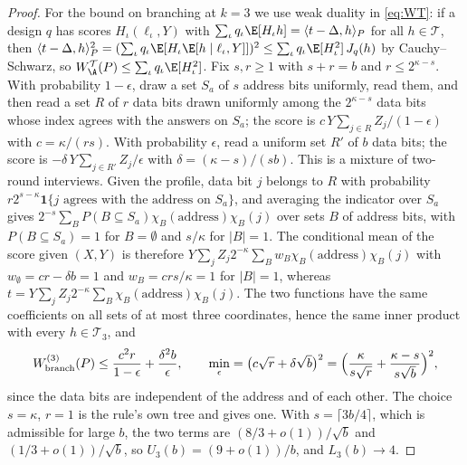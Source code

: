 \begin{proof}
For the bound on branching at $k=3$ we use weak duality in \eqref{eq:WT}: if
a design $q$ has scores $H_\iota(\ell_\iota,Y)$ with
$\sum_\iota q_\iota\E[H_\iota h]=\langle t-\Delta,h\rangle_P$ for all
$h\in\mathcal T$, then
$\langle t-\Delta,h\rangle_P^2=(\sum_\iota q_\iota\E[H_\iota\E[h\mid\ell_\iota,Y]])^2\le\sum_\iota q_\iota\E[H_\iota^2]\,J_q(h)$
by Cauchy--Schwarz, so $W^{\mathcal T}_\A(P)\le\sum_\iota q_\iota\E[H_\iota^2]$.
Fix $s,r\ge1$ with $s+r=b$ and $r\le2^{\kappa-s}$. With probability
$1-\epsilon$, draw a set $S_a$ of $s$ address bits uniformly, read them, and
then read a set $R$ of $r$ data bits drawn uniformly among the $2^{\kappa-s}$
data bits whose index agrees with the answers on $S_a$; the score is
$c\,Y\sum_{j\in R}Z_j/(1-\epsilon)$ with $c=\kappa/(rs)$. With probability
$\epsilon$, read a uniform set $R'$ of $b$ data bits; the score is
$-\delta\,Y\sum_{j\in R'}Z_j/\epsilon$ with $\delta=(\kappa-s)/(sb)$. This is a
mixture of two-round interviews. Given the profile, data bit $j$ belongs to
$R$ with probability $r2^{s-\kappa}\mathbf 1\{j\text{ agrees with the address on }S_a\}$,
and averaging the indicator over $S_a$ gives
$2^{-s}\sum_BP(B\subseteq S_a)\chi_B(\text{address})\chi_B(j)$ over sets $B$ of
address bits, with $P(B\subseteq S_a)=1$ for $B=\emptyset$ and $s/\kappa$ for
$|B|=1$. The conditional mean of the score given $(X,Y)$ is therefore
$Y\sum_jZ_j2^{-\kappa}\sum_Bw_B\chi_B(\text{address})\chi_B(j)$ with
$w_\emptyset=cr-\delta b=1$ and $w_B=crs/\kappa=1$ for $|B|=1$, whereas
$t=Y\sum_jZ_j2^{-\kappa}\sum_B\chi_B(\text{address})\chi_B(j)$. The two
functions have the same coefficients on all sets of at most three
coordinates, hence the same inner product with every $h\in\mathcal T_3$, and
\[
 W^{(3)}_{\rm branch}(P)\le\frac{c^2r}{1-\epsilon}+\frac{\delta^2b}{\epsilon},
 \qquad\min_\epsilon=\big(c\sqrt r+\delta\sqrt b\big)^2
 =\Big(\frac{\kappa}{s\sqrt r}+\frac{\kappa-s}{s\sqrt b}\Big)^2 ,
\]
since the data bits are independent of the address and of each other. The
choice $s=\kappa$, $r=1$ is the rule's own tree and gives one. With
$s=\lceil3b/4\rceil$, which is admissible for large $b$, the two terms are
$(8/3+o(1))/\sqrt b$ and $(1/3+o(1))/\sqrt b$, so $U_3(b)=(9+o(1))/b$, and
$L_3(b)\to4$.


\end{proof}
